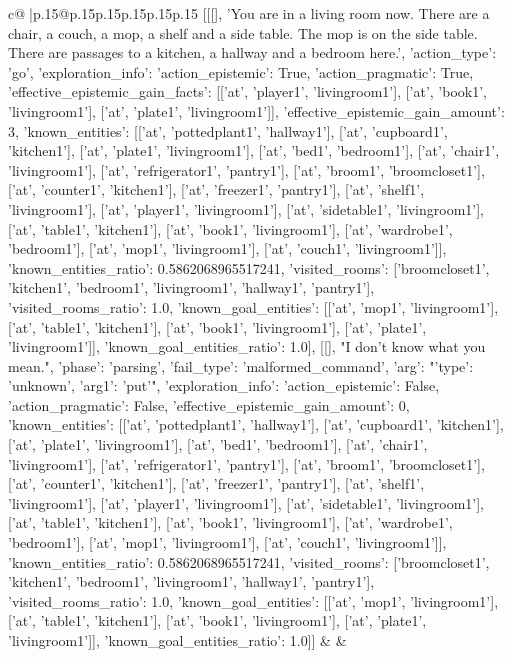 \documentclass{article}
\begin{document}
{\begin{supertabular}{c@{$\;$}|p{.15\linewidth}@{}p{.15\linewidth}p{.15\linewidth}p{.15\linewidth}p{.15\linewidth}p{.15\linewidth}}
{{{	 [[[], 'You are in a living room now. There are a chair, a couch, a mop, a shelf and a side table. The mop is on the side table. There are passages to a kitchen, a hallway and a bedroom here.', {'action_type': 'go', 'exploration_info': {'action_epistemic': True, 'action_pragmatic': True, 'effective_epistemic_gain_facts': [['at', 'player1', 'livingroom1'], ['at', 'book1', 'livingroom1'], ['at', 'plate1', 'livingroom1']], 'effective_epistemic_gain_amount': 3, 'known_entities': [['at', 'pottedplant1', 'hallway1'], ['at', 'cupboard1', 'kitchen1'], ['at', 'plate1', 'livingroom1'], ['at', 'bed1', 'bedroom1'], ['at', 'chair1', 'livingroom1'], ['at', 'refrigerator1', 'pantry1'], ['at', 'broom1', 'broomcloset1'], ['at', 'counter1', 'kitchen1'], ['at', 'freezer1', 'pantry1'], ['at', 'shelf1', 'livingroom1'], ['at', 'player1', 'livingroom1'], ['at', 'sidetable1', 'livingroom1'], ['at', 'table1', 'kitchen1'], ['at', 'book1', 'livingroom1'], ['at', 'wardrobe1', 'bedroom1'], ['at', 'mop1', 'livingroom1'], ['at', 'couch1', 'livingroom1']], 'known_entities_ratio': 0.5862068965517241, 'visited_rooms': ['broomcloset1', 'kitchen1', 'bedroom1', 'livingroom1', 'hallway1', 'pantry1'], 'visited_rooms_ratio': 1.0, 'known_goal_entities': [['at', 'mop1', 'livingroom1'], ['at', 'table1', 'kitchen1'], ['at', 'book1', 'livingroom1'], ['at', 'plate1', 'livingroom1']], 'known_goal_entities_ratio': 1.0}}], [[], "I don't know what you mean.", {'phase': 'parsing', 'fail_type': 'malformed_command', 'arg': "{'type': 'unknown', 'arg1': 'put'}", 'exploration_info': {'action_epistemic': False, 'action_pragmatic': False, 'effective_epistemic_gain_amount': 0, 'known_entities': [['at', 'pottedplant1', 'hallway1'], ['at', 'cupboard1', 'kitchen1'], ['at', 'plate1', 'livingroom1'], ['at', 'bed1', 'bedroom1'], ['at', 'chair1', 'livingroom1'], ['at', 'refrigerator1', 'pantry1'], ['at', 'broom1', 'broomcloset1'], ['at', 'counter1', 'kitchen1'], ['at', 'freezer1', 'pantry1'], ['at', 'shelf1', 'livingroom1'], ['at', 'player1', 'livingroom1'], ['at', 'sidetable1', 'livingroom1'], ['at', 'table1', 'kitchen1'], ['at', 'book1', 'livingroom1'], ['at', 'wardrobe1', 'bedroom1'], ['at', 'mop1', 'livingroom1'], ['at', 'couch1', 'livingroom1']], 'known_entities_ratio': 0.5862068965517241, 'visited_rooms': ['broomcloset1', 'kitchen1', 'bedroom1', 'livingroom1', 'hallway1', 'pantry1'], 'visited_rooms_ratio': 1.0, 'known_goal_entities': [['at', 'mop1', 'livingroom1'], ['at', 'table1', 'kitchen1'], ['at', 'book1', 'livingroom1'], ['at', 'plate1', 'livingroom1']], 'known_goal_entities_ratio': 1.0}}]] 
	  } 
	   } 
	   } 
	 & & \\ 
 


\end{supertabular}}
\end{document}
